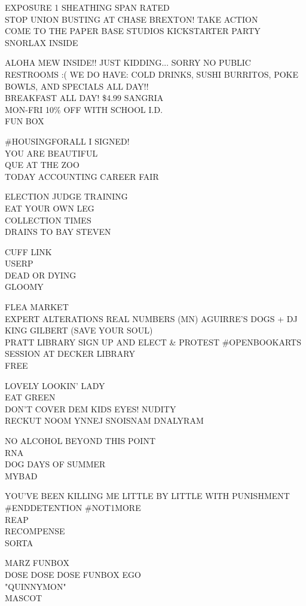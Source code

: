 \documentclass[10pt,letterpaper]{article}
\begin{document}
EXPOSURE 1 SHEATHING SPAN RATED\\
STOP UNION BUSTING AT CHASE BREXTON!   TAKE ACTION\\
COME TO THE PAPER BASE STUDIOS KICKSTARTER PARTY\\
SNORLAX INSIDE

ALOHA MEW INSIDE!! JUST KIDDING...  SORRY NO PUBLIC RESTROOMS :( WE DO HAVE: COLD DRINKS, SUSHI BURRITOS, POKE BOWLS, AND SPECIALS ALL DAY!!\\
BREAKFAST ALL DAY!  \$4.99 SANGRIA\\
MON{-}FRI 10\% OFF WITH SCHOOL I.D.\\
FUN BOX

\#HOUSINGFORALL I SIGNED!\\
YOU ARE BEAUTIFUL\\
QUE AT THE ZOO\\
TODAY ACCOUNTING CAREER FAIR

ELECTION JUDGE TRAINING\\
EAT YOUR OWN LEG\\
COLLECTION TIMES\\
DRAINS TO BAY STEVEN

CUFF LINK\\
USERP\\
DEAD OR DYING\\
GLOOMY

FLEA MARKET\\
EXPERT ALTERATIONS REAL NUMBERS (MN) AGUIRRE'S DOGS + DJ KING GILBERT (SAVE YOUR SOUL)\\
PRATT LIBRARY SIGN UP AND ELECT \& PROTEST \#OPENBOOKARTS SESSION AT DECKER LIBRARY\\
FREE

LOVELY LOOKIN' LADY\\
EAT GREEN\\
DON'T COVER DEM KIDS EYES!  NUDITY\\
RECKUT NOOM YNNEJ SNOISNAM DNALYRAM

NO ALCOHOL BEYOND THIS POINT\\
RNA\\
DOG DAYS OF SUMMER\\
MYBAD

YOU'VE BEEN KILLING ME LITTLE BY LITTLE WITH PUNISHMENT \#ENDDETENTION \#NOT1MORE\\
REAP\\
RECOMPENSE\\
SORTA

MARZ FUNBOX\\
DOSE DOSE DOSE FUNBOX EGO\\
"QUINNYMON"\\
MASCOT
\end{document}
